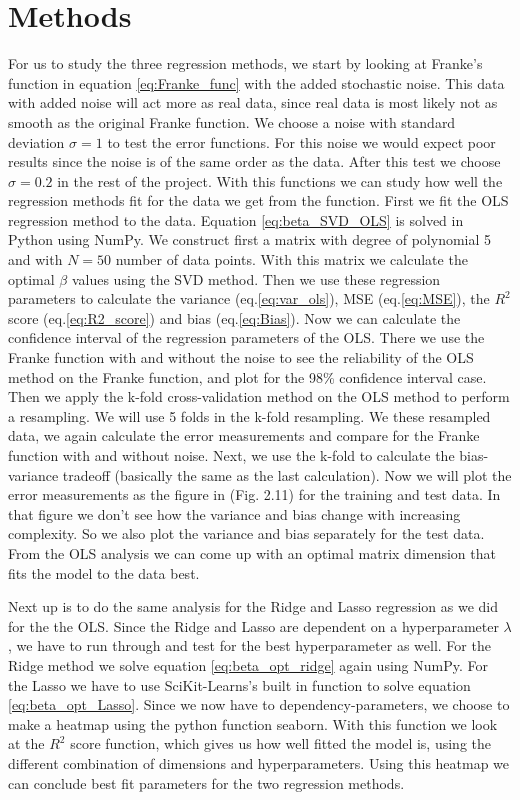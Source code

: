 \documentclass[12pt,a4paper,english]{article}
\begin{document}
\section{Methods}
For us to study the three regression methods, we start by looking at Franke's function in equation \ref{eq:Franke_func} with the added stochastic noise. This data with added noise will act more as real data, since real data is most likely not as smooth as the original Franke function. We choose a noise with standard deviation $\sigma=1$ to test the error functions. For this noise we would expect poor results since the noise is of the same order as the data. After this test we choose $\sigma=0.2$ in the rest of the project. With this functions we can study how well the regression methods fit for the data we get from the function. First we fit the OLS regression method to the data. Equation \ref{eq:beta_SVD_OLS} is solved in Python using NumPy. We construct first a matrix with degree of polynomial 5 and with $N=50$ number of data points. With this matrix we calculate the optimal $\beta$ values using the SVD method. Then we use these regression parameters to calculate the variance (eq.\ref{eq:var_ols}), MSE (eq.\ref{eq:MSE}), the $R^2$ score (eq.\ref{eq:R2_score}) and bias (eq.\ref{eq:Bias}). Now we can calculate the confidence interval of the regression parameters of the OLS. There we use the Franke function with and without the noise to see the reliability of the OLS method on the Franke function, and plot for the 98\% confidence interval case. Then we apply the k-fold cross-validation method on the OLS method to perform a resampling. We will use 5 folds in the k-fold resampling. We these resampled data, we again calculate the error measurements and compare for the Franke function with and without noise. Next, we use the k-fold to calculate the bias-variance tradeoff (basically the same as the last calculation). Now we will plot the error measurements as the figure in \citet{hastie2009} (Fig. 2.11) for the training and test data. In that figure we don't see how the variance and bias change with increasing complexity. So we also plot the variance and bias separately for the test data. From the OLS analysis we can come up with an optimal matrix dimension that fits the model to the data best.

Next up is to do the same analysis for the Ridge and Lasso regression as we did for the the OLS. Since the Ridge and Lasso are dependent on a hyperparameter $\lambda$, we have to run through and test for the best hyperparameter as well. For the Ridge method we solve equation \ref{eq:beta_opt_ridge} again using NumPy. For the Lasso we have to use SciKit-Learns's built in function to solve equation \ref{eq:beta_opt_Lasso}. Since we now have to dependency-parameters, we choose to make a heatmap using the python function seaborn. With this function we look at the $R^2$ score function, which gives us how well fitted the model is, using the different combination of dimensions and hyperparameters. Using this heatmap we can conclude best fit parameters for the two regression methods.
\end{document}
